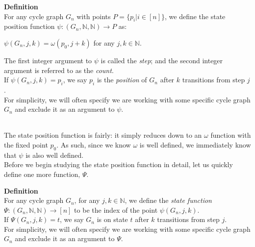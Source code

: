 \documentclass[a4paper,12pt]{article}
\begin{document}
\label{definition:state_position_function}
\hypertarget{definition:state_position_function}{}
\begin{tcolorbox}
\textbf{Definition}\\
For any cycle graph $G_n$ with points $P = \{ p_i | i \in [n] \}$, we define the state position function $\psi : (G_n, \mathbb{N}, \mathbb{N}) \rightarrow P$ as:

\begin{center}
$\psi(G_n, j, k) = \omega(p_0, j + k)$ for any $j, k \in \mathbb{N}$.
\end{center}

\noindent The first integer argument to $\psi$ is called the \textit{step}; and the second integer argument is referred to as the \textit{count}.\\

\noindent If $\psi(G_n, j, k) = p_i$, we say $p_i$ is the \textit{position} of $G_n$ after $k$ transitions from step $j$.\\

\noindent For simplicity, we will often specify we are working with some specific cycle graph $G_n$ and exclude it as an argument to $\psi$.
\end{tcolorbox}




\noindent
\\
The state position function is fairly: it simply reduces down to an $\omega$ function with the fixed point $p_0$. As such, since we know $\omega$ is well defined, we immediately know that $\psi$ is also well defined.\\

\noindent Before we begin studying the state position function in detail, let us quickly define one more function, $\Psi$.\\




\label{definition:state_function}
\hypertarget{definition:state_function}{}
\begin{tcolorbox}
\textbf{Definition}\\
For any cycle graph $G_n$, for any $j, k \in \mathbb{N}$, we define the \textit{state function} $\Psi : (G_n, \mathbb{N}, \mathbb{N}) \rightarrow [n]$
to be the index of the point $\psi(G_n, j, k)$.\\

\noindent If $\Psi(G_n, j, k) = t$, we say $G_n$ is on state $t$ after $k$ transitions from step $j$.\\

\noindent For simplicity, we will often specify we are working with some specific cycle graph $G_n$ and exclude it as an argument to $\Psi$.
\end{tcolorbox}
\noindent
\end{document}
